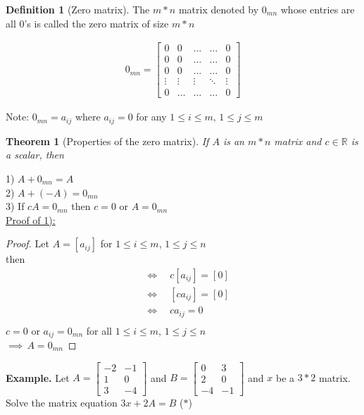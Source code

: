 \documentclass{jhwhw}
\newtheorem{theorem}{Theorem}
\theoremstyle{definition}
\newtheorem{definition}{Definition}
\theoremstyle{remark}
\theoremstyle{example}
\begin{document}
\begin{definition}[Zero matrix] The \(m*n\) matrix denoted by \(0_{mn}\) whose entries are all 0's is called the zero matrix of size \(m*n\) \end{definition}
\begin{align*} 0_{mn} = \begin{bmatrix} 0 & 0 & \ldots & \ldots & 0 \\ 0 & 0 & \ldots & \ldots & 0 \\ 0 & 0 & \ldots & \ldots & 0 \\ \vdots & \vdots & \vdots & \ddots & \vdots \\ 0 & \ldots & \ldots & \ldots & 0  \end{bmatrix} \end{align*}

Note: \(0_{mn} = a_{ij}\) where \(a_{ij}=0\) for any \(1 \leq i \leq m, \, 1 \leq j \leq m\)
\begin{theorem}[Properties of the zero matrix] If \(A\) is an \(m*n\) matrix and \(c \in \mathbb{R}\) is a scalar, then \end{theorem}

1) \(A + 0_{mn} = A\)\\
2) \(A+(-A) = 0_{mn}\)\\
3) If \(cA = 0_{mn}\) then \(c = 0\) or \(A = 0_{mn}\)
\\

\underline{Proof of 1):}
\\
\begin{proof} 
Let \(A=[a_{ij}]\) for \(1 \leq i \leq m\), \(1 \leq j \leq n\)\\
then \begin{align*} 
& \Leftrightarrow \quad c[a_{ij}] = [0]\\
& \Leftrightarrow \quad [c a_{ij}] = [0]\\
& \Leftrightarrow \quad c a_{ij} = 0\\
\end{align*}
\(c=0\) or \(a_{ij} = 0_{mn}\)  for all \( 1 \leq i \leq m\), \(1 \leq j \leq n\)\\
\(\implies \, A = 0_{mn}\)
\end{proof}
\textbf{Example.}
    Let \(A = \begin{bmatrix} -2 & -1 \\ 1 & 0 \\ 3 & -4 \end{bmatrix}\) and \(B = \begin{bmatrix} 0 & 3 \\ 2 & 0 \\ -4 & -1 \end{bmatrix}\) and \(x\) be a \(3*2\) matrix. Solve the matrix equation \(3x+2A=B\) (\(\ast\))\\
\end{document}
